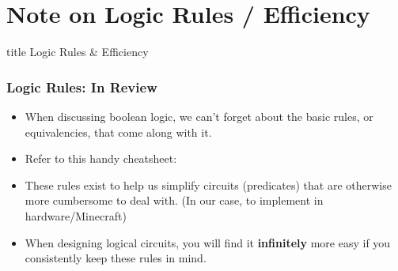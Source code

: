 \documentclass{beamer}
\begin{document}
            
            
            
            
            
    \section{Note on Logic Rules / Efficiency}
    
    	 \begin{frame}
                \vfill
                \centering
                \begin{beamercolorbox}[sep=8pt,center,shadow=true,rounded=true]{title}
                    Logic Rules \& Efficiency\par%
                \end{beamercolorbox}
            \vfill
         \end{frame}
    
    	\begin{frame}
                \frametitle{Logic Rules: In Review}
                \begin{itemize}
                    \item When discussing boolean logic, we can't forget about the basic rules, or equivalencies, that come along with it.
                    \item Refer to this handy cheatsheet: \href{http://www.cs.umd.edu/class/spring2019/cmsc250-020X/files/logic-laws.pdf}{}
                    \item These rules exist to help us simplify circuits (predicates) that are otherwise more cumbersome to deal with. (In our case, to implement in hardware/Minecraft)
                    \item When designing logical circuits, you will find it \textbf{infinitely} more easy if you consistently keep these rules in mind.
                \end{itemize}
            \end{frame}
            
\end{document}
